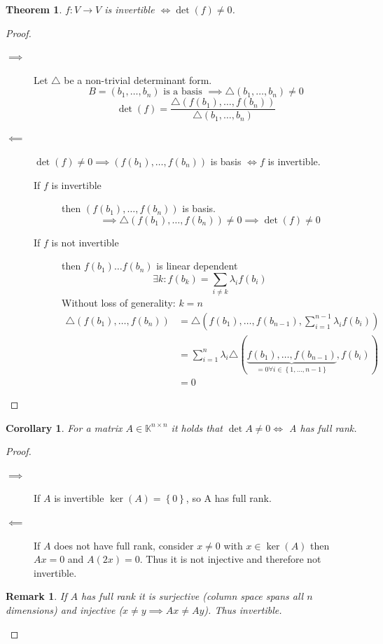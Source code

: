 \documentclass[a4paper]{article}
\newcounter{lecref}[section]
\numberwithin{lecref}{section}
\newtheorem{theorem}[lecref]{Theorem}
\newtheorem*{Remark}{Remark}
\newtheorem{corollary}[lecref]{Corollary}
\newcommand{\set}[1]{\left\{#1\right\}}
\begin{document}
\begin{theorem} %
  $f: V \to V$ is invertible $\iff \det(f) \neq 0$.
\end{theorem}
\begin{proof}
  \begin{description}
    \item[$\implies$] 
      Let $\triangle$ be a non-trivial determinant form.
      \[ B = (b_1, \dots, b_n) \text{ is a basis } \implies \triangle(b_1, \dots, b_n) \neq 0 \]
      \[ \det(f) = \frac{\triangle(f(b_1), \dots, f(b_n))}{\triangle(b_1, \dots, b_n)} \]
    \item[$\impliedby$]
      $\det(f) \neq 0 \implies (f(b_1), \dots, f(b_n))$ is basis $\iff f$ is invertible.
      \begin{description}
        \item[If $f$ is invertible] then $(f(b_1), \dots, f(b_n))$ is basis.
          \[ \implies \triangle (f(b_1), \dots, f(b_n)) \neq 0 \implies \det(f) \neq 0 \]
        \item[If $f$ is not invertible] then $f(b_1) \dots f(b_n)$ is linear dependent
          \[ \exists k: f(b_k) = \sum_{i\neq k} \lambda_i f(b_i) \]
          Without loss of generality: $k = n$
          \begin{align*}
            \triangle(f(b_1), \dots, f(b_n)) &= \triangle(f(b_1), \dots, f(b_{n-1}), \sum_{i=1}^{n-1} \lambda_i f(b_i)) \\
              &= \sum_{i=1}^n \lambda_i \triangle(\underbrace{f(b_1), \dots, f(b_{n-1})}_{=0 \forall i \in \set{1,\dots,n-1}}, f(b_i)) \\
              &= 0
          \end{align*}
      \end{description}
  \end{description}
\end{proof}

\begin{corollary}
  For a matrix $A \in \mathbb K^{n\times n}$ it holds that $\det{A} \neq 0 \iff$ A has full rank.
\end{corollary}

\begin{proof}
  \begin{description}
    \item[$\implies$]
      If $A$ is invertible $\ker(A) = \set{0}$, so A has full rank.
    \item[$\impliedby$] 
      If $A$ does not have full rank, consider $x \neq 0$ with $x \in \operatorname{ker}(A)$ then $Ax = 0$ and $A(2x) = 0$. Thus it is not injective and therefore not invertible.
  \end{description}

  \begin{Remark}
    If $A$ has full rank it is surjective (column space spans all $n$ dimensions) and injective ($x \neq y \implies Ax \neq Ay$). Thus invertible.
  \end{Remark}
\end{proof}
\end{document}
